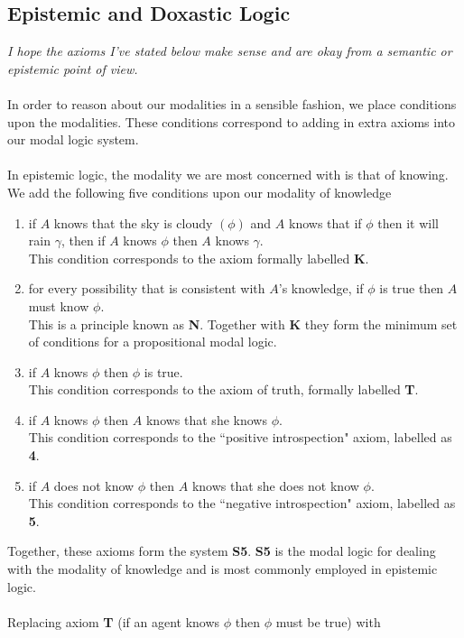 \documentclass[12pt, a4paper, twoside]{article}
\begin{document}
\subsection{Epistemic and Doxastic Logic}\label{epistemic_logics}
{\em I hope the axioms I've stated below make sense and are okay from a
	semantic or epistemic point of view.}\\
\\
In order to reason about our modalities in a sensible fashion, we place
conditions upon the modalities.
These conditions correspond to adding in extra axioms into our modal logic
system. \citep{hoek2008dynamic}\\
\\
In epistemic logic, the modality we are most concerned with is that of knowing.
We add the following five conditions upon our modality of knowledge
\begin{enumerate}
	\item if $A$ knows that the sky is cloudy $(\phi)$ and $A$ knows that if
	$\phi$ then it will rain $\gamma$, then if $A$ knows $\phi$ then $A$ knows
	$\gamma$.\\
	This condition corresponds to the axiom formally labelled {\bf K}.
	\item for every possibility that is consistent with $A$'s knowledge, if $\phi$
	is true then $A$ must know $\phi$.\\
	This is a principle known as {\bf N}.
	Together with {\bf K} they form the minimum set of conditions for a
	propositional modal logic.
	\item if $A$ knows $\phi$ then $\phi$ is true.\\
	This condition corresponds to the axiom of truth, formally labelled {\bf T}.
	\item if $A$ knows $\phi$ then $A$ knows that she knows $\phi$.\\
	This condition corresponds to the ``positive introspection" axiom, labelled 
	as {\bf 4}.
	\item if $A$ does not know $\phi$ then $A$ knows that she does not know
	$\phi$.\\
	This condition corresponds to the ``negative introspection" axiom, labelled 
	as {\bf 5}.
\end{enumerate}
Together, these axioms form the system {\bf S5}.
{\bf S5} is the modal logic for dealing with the modality of knowledge and is
most commonly employed in epistemic logic.\\
\\
Replacing axiom {\bf T} (if an agent knows $\phi$ then $\phi$ must be true) with
\end{document}
